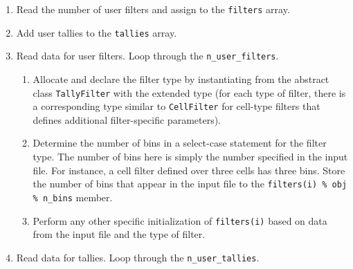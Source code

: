 \documentclass[10pt]{article}
\numberwithin{equation}{section} %
\begin{document}
\begin{enumerate}
\item Read the number of user filters and assign to the {\tt filters} array. %
\item Add user tallies to the {\tt tallies} array.%
\item Read data for user filters. Loop through the {\tt n\_user\_filters}.
	\begin{enumerate}
	\item Allocate and declare the filter type by instantiating from the abstract class {\tt TallyFilter} with the extended type (for each type of filter, there is a corresponding type similar to {\tt CellFilter} for cell-type filters that defines additional filter-specific parameters).
	\item Determine the number of bins in a select-case statement for the filter type. The number of bins here is simply the number specified in the input file. For instance, a cell filter defined over three cells has three bins. Store the number of bins that appear in the input file to the {\tt filters(i) \% obj \% n\_bins} member.
	\item Perform any other specific initialization of {\tt filters(i)} based on data from the input file and the type of filter.
	\end{enumerate}
\item Read data for tallies. Loop through the {\tt n\_user\_tallies}.
	\begin{enumerate}

\end{enumerate}
\end{enumerate}
\end{document}
